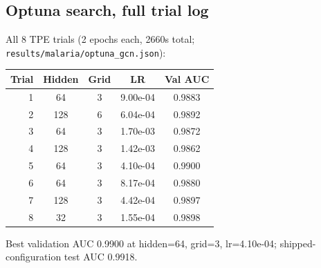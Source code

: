 \subsection{Optuna search, full trial log}
All 8 TPE trials (2 epochs each,
2660s total; \texttt{results/malaria/optuna\_gcn.json}):
\begin{longtable}{r c c c c}
\hline Trial & Hidden & Grid & LR & Val AUC \\ \hline \endhead
1 & 64 & 3 & 9.00e-04 & 0.9883 \\
2 & 128 & 6 & 6.04e-04 & 0.9892 \\
3 & 64 & 3 & 1.70e-03 & 0.9872 \\
4 & 128 & 3 & 1.42e-03 & 0.9862 \\
5 & 64 & 3 & 4.10e-04 & 0.9900 \\
6 & 64 & 3 & 8.17e-04 & 0.9880 \\
7 & 128 & 3 & 4.42e-04 & 0.9897 \\
8 & 32 & 3 & 1.55e-04 & 0.9898 \\
\hline
\end{longtable}
Best validation AUC 0.9900 at
hidden=64, grid=3,
lr=4.10e-04; shipped-configuration test AUC
0.9918.
